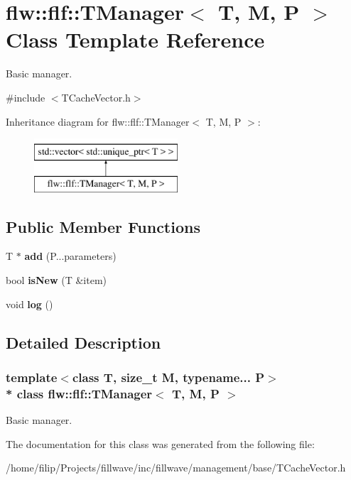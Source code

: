 \hypertarget{classflw_1_1flf_1_1TManager}{}\section{flw\+:\+:flf\+:\+:T\+Manager$<$ T, M, P $>$ Class Template Reference}
\label{classflw_1_1flf_1_1TManager}


Basic manager.  




{\ttfamily \#include $<$T\+Cache\+Vector.\+h$>$}

Inheritance diagram for flw\+:\+:flf\+:\+:T\+Manager$<$ T, M, P $>$\+:\begin{figure}[H]
\begin{center}
\leavevmode
\includegraphics[height=2.000000cm]{classflw_1_1flf_1_1TManager}
\end{center}
\end{figure}
\subsection*{Public Member Functions}
\begin{DoxyCompactItemize}
\item 
T $\ast$ {\bfseries add} (P...\+parameters)\hypertarget{classflw_1_1flf_1_1TManager_a67be291bd6affa130b6db4cc1293f5c1}{}\label{classflw_1_1flf_1_1TManager_a67be291bd6affa130b6db4cc1293f5c1}

\item 
bool {\bfseries is\+New} (T \&item)\hypertarget{classflw_1_1flf_1_1TManager_a626091038d8f90db4dee5ff398ca04b9}{}\label{classflw_1_1flf_1_1TManager_a626091038d8f90db4dee5ff398ca04b9}

\item 
void {\bfseries log} ()\hypertarget{classflw_1_1flf_1_1TManager_a475ce027f66ca5cab77a72672e181f2d}{}\label{classflw_1_1flf_1_1TManager_a475ce027f66ca5cab77a72672e181f2d}

\end{DoxyCompactItemize}


\subsection{Detailed Description}
\subsubsection*{template$<$class T, size\+\_\+t M, typename... P$>$\\*
class flw\+::flf\+::\+T\+Manager$<$ T, M, P $>$}

Basic manager. 

The documentation for this class was generated from the following file\+:\begin{DoxyCompactItemize}
\item 
/home/filip/\+Projects/fillwave/inc/fillwave/management/base/T\+Cache\+Vector.\+h\end{DoxyCompactItemize}
